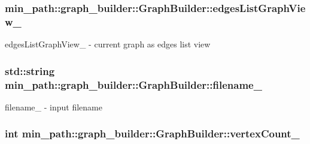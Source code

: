 \subsubsection[{\texorpdfstring{edges\+List\+Graph\+View\+\_\+}{edgesListGraphView_}}]{ min\+\_\+path\+::graph\+\_\+builder\+::\+Graph\+Builder\+::edges\+List\+Graph\+View\+\_\+\hspace{0.3cm}{\ttfamily [private]}}\hypertarget{a00007_ab85998431c78d73435592bc472244b5d_ab85998431c78d73435592bc472244b5d}{}\label{a00007_ab85998431c78d73435592bc472244b5d_ab85998431c78d73435592bc472244b5d}


edges\+List\+Graph\+View\+\_\+ -\/ current graph as edges list view 

\subsubsection[{\texorpdfstring{filename\+\_\+}{filename_}}]{\setlength{\rightskip}{0pt plus 5cm}std\+::string min\+\_\+path\+::graph\+\_\+builder\+::\+Graph\+Builder\+::filename\+\_\+\hspace{0.3cm}{\ttfamily [private]}}\hypertarget{a00007_a49e700993aec96bffaa4728eca205731_a49e700993aec96bffaa4728eca205731}{}\label{a00007_a49e700993aec96bffaa4728eca205731_a49e700993aec96bffaa4728eca205731}


filename\+\_\+ -\/ input filename 

\subsubsection[{\texorpdfstring{vertex\+Count\+\_\+}{vertexCount_}}]{\setlength{\rightskip}{0pt plus 5cm}int min\+\_\+path\+::graph\+\_\+builder\+::\+Graph\+Builder\+::vertex\+Count\+\_\+\hspace{0.3cm}{\ttfamily [private]}}\hypertarget{a00007_ae1613c30ca3542a05340fb9b355ed994_ae1613c30ca3542a05340fb9b355ed994}{}\label{a00007_ae1613c30ca3542a05340fb9b355ed994_ae1613c30ca3542a05340fb9b355ed994}


